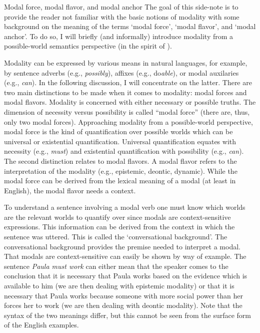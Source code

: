 \begin{digression}{{Modal force, modal flavor, and modal anchor}}{}
\noindent The goal of this side-note is to provide the reader not familiar with the basic notions of modality with some background on the meaning of the terms `modal force', `modal flavor', and `modal anchor'. To do so, I will briefly (and informally) introduce modality from a possible-world semantics perspective (in the spirit of \citealt{kratzer1981, kratzer1991}).

Modality can be expressed by various means in natural languages, for example, by sentence adverbs (e.g., \textit{possibly}), affixes (e.g., do\textit{able}), or modal auxilaries (e.g., \textit{can}). In the following discussion, I will concentrate on the latter. There are two main distinctions to be made when it comes to modality: modal forces and modal flavors. Modality is concerned with either necessary or possible truths. The dimension of necessity versus possibility is called ``modal force'' (there are, thus, only two modal forces). Approaching modality from a possible-world perspective, modal force is the kind of quantification over possible worlds which can be universal or existential quantification. Universal quantification equates with necessity (e.g., \textit{must}) and existential quantification with possibility (e.g., \textit{can}). The second distinction relates to modal flavors. A modal flavor refers to the interpretation of the modality (e.g., epistemic, deontic, dynamic). While the modal force can be derived from the lexical meaning of a modal (at least in English), the modal flavor needs a context.

To understand a sentence involving a modal verb one must know which worlds are the relevant worlds to quantify over since modals are context-sensitive expressions. This information can be derived from the context in which the sentence was uttered. This is called the `conversational background'. The conversational background provides the premise needed to interpret a modal. That modals are context-sensitive can easily be shown by way of example. The sentence \textit{Paula must work} can either mean that the speaker comes to the conclusion that it is necessary that Paula works based on the evidence which is available to him (we are then dealing with epistemic modality) or that it is necessary that Paula works because someone with more social power than her forces her to work (we are then dealing with deontic modality). Note that the syntax of the two meanings differ, but this cannot be seen from the surface form of the English examples.


\end{digression}
